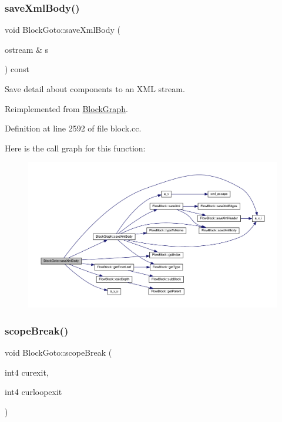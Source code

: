 \subsubsection{\texorpdfstring{saveXmlBody()}{saveXmlBody()}}
{\footnotesize\ttfamily void Block\+Goto\+::save\+Xml\+Body (\begin{DoxyParamCaption}\item[{ostream \&}]{s }\end{DoxyParamCaption}) const\hspace{0.3cm}{\ttfamily [virtual]}}



Save detail about components to an X\+ML stream. 



Reimplemented from \mbox{\hyperlink{class_block_graph_a881076195239ce5c2e5c865f22714d03}{Block\+Graph}}.



Definition at line 2592 of file block.\+cc.

Here is the call graph for this function\+:
\nopagebreak
\begin{figure}[H]
\begin{center}
\leavevmode
\includegraphics[width=350pt]{class_block_goto_a4210ef977a85a74b9923e405057b093b_cgraph}
\end{center}
\end{figure}
\mbox{\label{class_block_goto_ad409112a4ad46f076a923bd152428a83}} 
\subsubsection{\texorpdfstring{scopeBreak()}{scopeBreak()}}
{\footnotesize\ttfamily void Block\+Goto\+::scope\+Break (\begin{DoxyParamCaption}\item[{int4}]{curexit,  }\item[{int4}]{curloopexit }\end{DoxyParamCaption})\hspace{0.3cm}{\ttfamily [virtual]}}



